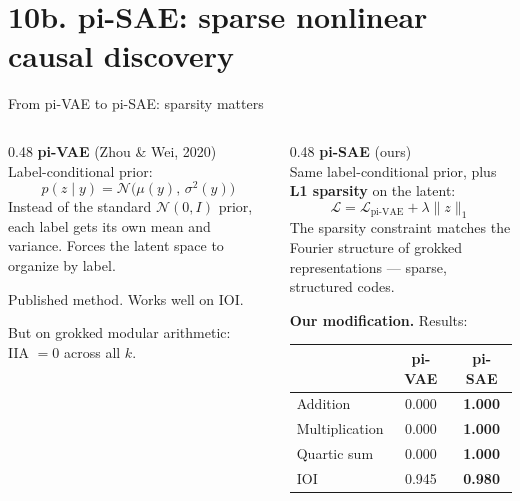 \documentclass[aspectratio=169,11pt]{beamer}
\newcommand{\IIA}{\mathrm{IIA}}
\begin{document}
\hypertarget{sec10b}{}
\section{10b. pi-SAE: sparse nonlinear causal discovery}

\begin{frame}{From pi-VAE to pi-SAE: sparsity matters}

\begin{columns}[T]
\begin{column}{0.48\textwidth}
\textbf{pi-VAE} {\small (Zhou \& Wei, 2020)}\\[0.3em]
{\small Label-conditional prior:}
\vspace{-0.2em}
\[ p(z \mid y) = \mathcal{N}\!\bigl(\mu(y),\, \sigma^2(y)\bigr) \]
\vspace{-0.5em}
{\small Instead of the standard $\mathcal{N}(0, I)$ prior, each label gets its own mean and variance. Forces the latent space to organize by label.}

\vspace{0.5em}
{\small Published method. Works well on IOI.}

\vspace{0.3em}
{\small But on grokked modular arithmetic:\\IIA $= 0$ across all $k$.}

\end{column}
\begin{column}{0.48\textwidth}
\textbf{pi-SAE} {\small \textcolor{vae}{(ours)}}\\[0.3em]
{\small Same label-conditional prior, plus \textbf{L1 sparsity} on the latent:}
\vspace{-0.2em}
\[ \mathcal{L} = \mathcal{L}_\text{pi-VAE} + \lambda \|z\|_1 \]
\vspace{-0.5em}
{\small The sparsity constraint matches the Fourier structure of grokked representations --- sparse, structured codes.}

\vspace{0.5em}
{\small \textbf{Our modification.} Results:}

\vspace{0.3em}
\begin{tabular}{@{}lcc@{}}
& \textbf{pi-VAE} & \textbf{pi-SAE} \\
\midrule
{\small Addition} & 0.000 & \textbf{\textcolor{always}{1.000}} \\
{\small Multiplication} & 0.000 & \textbf{\textcolor{always}{1.000}} \\
{\small Quartic sum} & 0.000 & \textbf{\textcolor{always}{1.000}} \\
{\small IOI} & 0.945 & \textbf{\textcolor{always}{0.980}} \\
\end{tabular}


\end{column}
\end{columns}
\end{frame}
\end{document}
